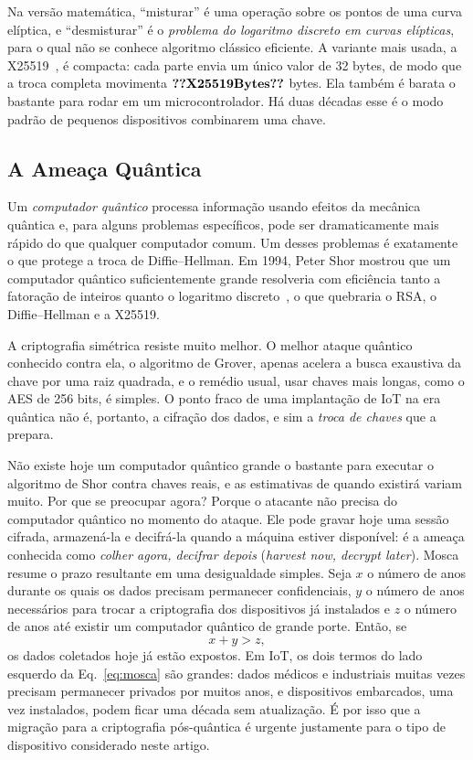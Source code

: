 Na versão matemática, ``misturar'' é uma operação sobre os pontos de uma curva
elíptica, e ``desmisturar'' é o \emph{problema do logaritmo discreto em curvas
elípticas}, para o qual não se conhece algoritmo clássico eficiente. A variante
mais usada, a X25519~\cite{bernstein2006curve25519,rfc7748}, é compacta: cada
parte envia um único valor de 32 bytes, de modo que a troca completa movimenta
$\val{X25519Bytes}$ bytes. Ela também é barata o bastante para rodar em um
microcontrolador. Há duas décadas esse é o modo padrão de pequenos dispositivos
combinarem uma chave.

\subsection{A Ameaça Quântica}\label{sec:fund-quantum}
Um \emph{computador quântico} processa informação usando efeitos da mecânica
quântica e, para alguns problemas específicos, pode ser dramaticamente mais
rápido do que qualquer computador comum. Um desses problemas é exatamente o que
protege a troca de Diffie--Hellman. Em 1994, Peter Shor mostrou que um
computador quântico suficientemente grande resolveria com eficiência tanto a
fatoração de inteiros quanto o logaritmo discreto~\cite{shor1997}, o que
quebraria o RSA, o Diffie--Hellman e a X25519.

A criptografia simétrica resiste muito melhor. O melhor ataque quântico
conhecido contra ela, o algoritmo de Grover, apenas acelera a busca exaustiva
da chave por uma raiz quadrada, e o remédio usual, usar chaves mais longas,
como o AES de 256 bits, é simples. O ponto fraco de uma implantação de IoT na
era quântica não é, portanto, a cifração dos dados, e sim a \emph{troca de
chaves} que a prepara.

Não existe hoje um computador quântico grande o bastante para executar o
algoritmo de Shor contra chaves reais, e as estimativas de quando existirá
variam muito. Por que se preocupar agora? Porque o atacante não precisa do
computador quântico no momento do ataque. Ele pode gravar hoje uma sessão
cifrada, armazená-la e decifrá-la quando a máquina estiver disponível: é a
ameaça conhecida como \emph{colher agora, decifrar depois} (\emph{harvest now,
decrypt later}). Mosca~\cite{mosca2018quantum} resume o prazo resultante em uma
desigualdade simples. Seja $x$ o número de anos durante os quais os dados
precisam permanecer confidenciais, $y$ o número de anos necessários para trocar
a criptografia dos dispositivos já instalados e $z$ o número de anos até
existir um computador quântico de grande porte. Então, se
\begin{equation}
x + y > z,
\label{eq:mosca}
\end{equation}
os dados coletados hoje já estão expostos. Em IoT, os dois termos do lado
esquerdo da Eq.~\eqref{eq:mosca} são grandes: dados médicos e industriais
muitas vezes precisam permanecer privados por muitos anos, e dispositivos
embarcados, uma vez instalados, podem ficar uma década sem atualização. É por
isso que a migração para a criptografia pós-quântica é urgente justamente para
o tipo de dispositivo considerado neste artigo.

